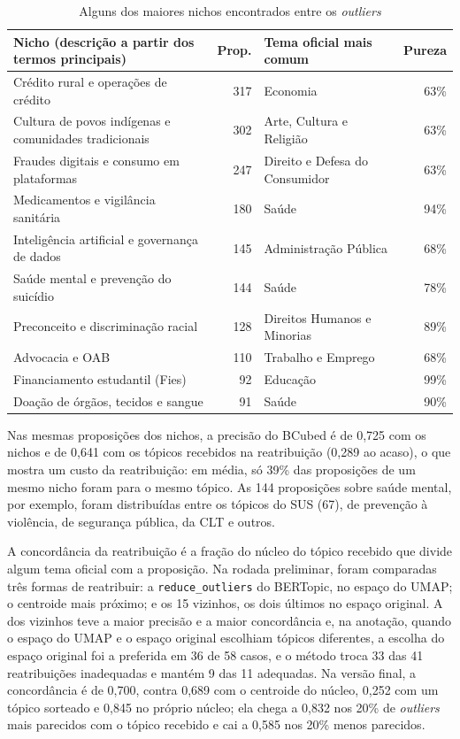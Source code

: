 \documentclass[12pt]{article}
\newcommand{\tabfont}{\fontsize{9}{11}\selectfont\setlength{\tabcolsep}{2.5pt}}
\begin{document}
\begin{table}[H]
\centering
\caption{Alguns dos maiores nichos encontrados entre os \textit{outliers}}
\label{tab:nichos}
\tabfont
\begin{tabular}{l r l r}
\toprule
\textbf{Nicho (descrição a partir dos termos principais)} & \textbf{Prop.} & \textbf{Tema oficial mais comum} & \textbf{Pureza} \\
\midrule
Crédito rural e operações de crédito & 317 & Economia & 63\% \\
Cultura de povos indígenas e comunidades tradicionais & 302 & Arte, Cultura e Religião & 63\% \\
Fraudes digitais e consumo em plataformas & 247 & Direito e Defesa do Consumidor & 63\% \\
Medicamentos e vigilância sanitária & 180 & Saúde & 94\% \\
Inteligência artificial e governança de dados & 145 & Administração Pública & 68\% \\
Saúde mental e prevenção do suicídio & 144 & Saúde & 78\% \\
Preconceito e discriminação racial & 128 & Direitos Humanos e Minorias & 89\% \\
Advocacia e OAB & 110 & Trabalho e Emprego & 68\% \\
Financiamento estudantil (Fies) & 92 & Educação & 99\% \\
Doação de órgãos, tecidos e sangue & 91 & Saúde & 90\% \\
\bottomrule
\end{tabular}
\end{table}

Nas mesmas proposições dos nichos, a precisão do BCubed é de 0,725 com os nichos e de 0,641 com os tópicos recebidos na reatribuição (0,289 ao acaso), o que mostra um custo da reatribuição: em média, só 39\% das proposições de um mesmo nicho foram para o mesmo tópico. As 144 proposições sobre saúde mental, por exemplo, foram distribuídas entre os tópicos do SUS (67), de prevenção à violência, de segurança pública, da CLT e outros.

A concordância da reatribuição é a fração do núcleo do tópico recebido que divide algum tema oficial com a proposição. Na rodada preliminar, foram comparadas três formas de reatribuir: a \texttt{reduce\_outliers} do BERTopic, no espaço do UMAP; o centroide mais próximo; e os 15 vizinhos, os dois últimos no espaço original. A dos vizinhos teve a maior precisão e a maior concordância e, na anotação, quando o espaço do UMAP e o espaço original escolhiam tópicos diferentes, a escolha do espaço original foi a preferida em 36 de 58 casos, e o método troca 33 das 41 reatribuições inadequadas e mantém 9 das 11 adequadas. Na versão final, a concordância é de 0,700, contra 0,689 com o centroide do núcleo, 0,252 com um tópico sorteado e 0,845 no próprio núcleo; ela chega a 0,832 nos 20\% de \textit{outliers} mais parecidos com o tópico recebido e cai a 0,585 nos 20\% menos parecidos.
\end{document}
